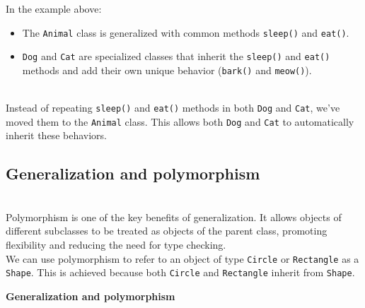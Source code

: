 In the example above:

\begin{itemize}
\item
\protect{}\label{84jMVL1eaKJzfuuNAooUd}
The \texttt{Animal} class is generalized with common methods \texttt{sleep()} and \texttt{eat()}.
\item
\protect{}\label{aY2j45-FTHSCr7hndQgo6}
\texttt{Dog} and \texttt{Cat} are specialized classes that inherit the \texttt{sleep()} and \texttt{eat()} methods and add their own unique behavior (\texttt{bark()} and \texttt{meow()}).
\end{itemize}
\\
Instead of repeating \texttt{sleep()} and \texttt{eat()} methods in both \texttt{Dog} and \texttt{Cat}, we've moved them to the \texttt{Animal} class. This allows both \texttt{Dog} and \texttt{Cat} to automatically inherit these behaviors.

\subsection{Generalization and polymorphism}\label{yrY_vvs65DdO2TfeNkw20}
\\
Polymorphism is one of the key benefits of generalization. It allows objects of different subclasses to be treated as objects of the parent class, promoting flexibility and reducing the need for type checking.
\\
We can use polymorphism to refer to an object of type \texttt{Circle} or \texttt{Rectangle} as a \texttt{Shape}. This is achieved because both \texttt{Circle} and \texttt{Rectangle} inherit from \texttt{Shape}.

\textbf{Generalization and polymorphism}

